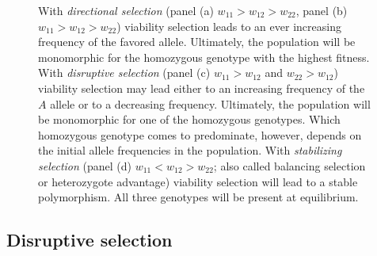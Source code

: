 \begin{figure}
\begin{center}
\end{center}
\caption{With {\it directional selection\/} (panel (a) $w_{11} > w_{12} >
w_{22}$, panel (b) $w_{11} > w_{12} > w_{22}$) viability selection
leads to an ever increasing frequency of
the favored allele.  Ultimately, the population will be monomorphic
for the homozygous genotype with the highest
fitness. With {\it disruptive selection\/} (panel (c) $w_{11} >
w_{12}$ and $w_{22} > w_{12}$) viability selection may lead either to
an increasing   frequency of the $A$ allele or to a decreasing frequency.
  Ultimately, the population will be monomorphic for one of the
  homozygous genotypes.  Which homozygous genotype comes to
  predominate, however, depends on the initial allele frequencies in
  the population. With {\it stabilizing selection\/} (panel (d) $w_{11} < w_{12}
  > w_{22}$; also called balancing selection or heterozygote
  advantage) viability selection will lead to a stable polymorphism.
  All three genotypes will be present at equilibrium.}\label{fig:wbar}
\end{figure}

\subsection*{Disruptive selection}

